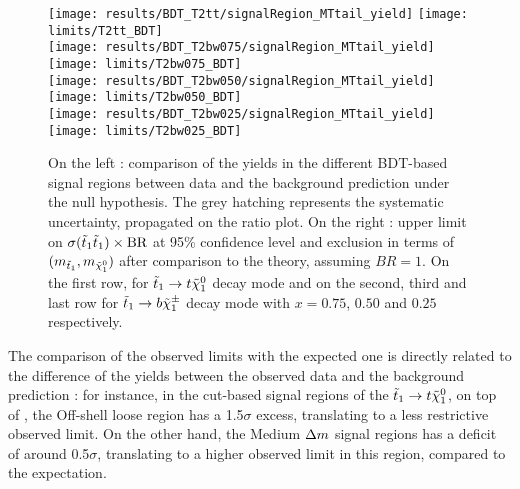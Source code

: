     \begin{figure}[h!]
        \centering
        \texttt{[image: results/BDT\_T2tt/signalRegion\_MTtail\_yield]}
        \texttt{[image: limits/T2tt\_BDT]}\\
        \texttt{[image: results/BDT\_T2bw075/signalRegion\_MTtail\_yield]}
        \texttt{[image: limits/T2bw075\_BDT]}\\
        \texttt{[image: results/BDT\_T2bw050/signalRegion\_MTtail\_yield]}
        \texttt{[image: limits/T2bw050\_BDT]}\\
        \texttt{[image: results/BDT\_T2bw025/signalRegion\_MTtail\_yield]}
        \texttt{[image: limits/T2bw025\_BDT]}\\
        \caption{On the left : comparison of the yields in the different BDT-based signal
        regions between data and the background prediction under the null hypothesis. The
        grey hatching represents the systematic uncertainty, propagated on the ratio plot.
        On the right : upper limit on $\sigma(\tilde{t}_1\tilde{t}_1) \times \text{BR}$ at 95\% confidence level and exclusion in terms of
        $(m_{\tilde{t}_1},m_{\tilde{\chi}_1^0})$ after comparison to the theory, assuming
        $BR = 1$. On the first row, for $\tilde{t}_1 \rightarrow t \tilde{\chi}_1^0$ decay mode and on
        the second, third and last row for $\tilde{t}_1 \rightarrow b \tilde{\chi}_1^\pm$ decay mode
        with $x=0.75$, $0.50$ and $0.25$ respectively.}
        \label{fig:resultsBDT}
    \end{figure}

    The comparison of the observed limits with the expected one is directly related to
    the difference of the yields between the observed data and the background prediction :
    for instance, in the cut-based signal regions of the $\tilde{t}_1 \rightarrow t \tilde{\chi}_1^0$,
    on top of , the Off-shell loose region has a 1.5$\sigma$ excess,
    translating to a less restrictive observed limit. On the other hand, the Medium $\Delta m$
    signal regions has a deficit of around 0.5$\sigma$, translating to a higher observed
    limit in this region, compared to the expectation.

